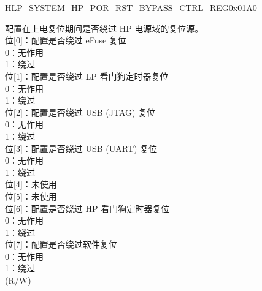 \begin{register}{H}{LP\_SYSTEM\_HP\_POR\_RST\_BYPASS\_CTRL\_REG}{0x01A0}
\begin{regdesc}\begin{reglist}
\item [接上页...]
\label{fielddesc:LPSYSTEMHPPORSTNBYPASSCTRL}\item [LP\_SYSTEM\_HP\_PO\_RSTN\_BYPASS\_CTRL] 配置在上电复位期间是否绕过 HP 电源域的复位源。\\
位[0]：配置是否绕过 eFuse 复位\\
0：无作用\\
1：绕过\\
位[1]：配置是否绕过 LP 看门狗定时器复位\\
0：无作用\\
1：绕过\\
位[2]：配置是否绕过 USB (JTAG) 复位\\
0：无作用\\
1：绕过\\
位[3]：配置是否绕过 USB (UART) 复位\\
0：无作用\\
1：绕过\\
位[4]：未使用\\
位[5]：未使用\\
位[6]：配置是否绕过 HP 看门狗定时器复位\\
0：无作用\\
1：绕过\\
位[7]：配置是否绕过软件复位\\
0：无作用\\
1：绕过\\
(R/W)
\end{reglist}\end{regdesc}
\end{register}


